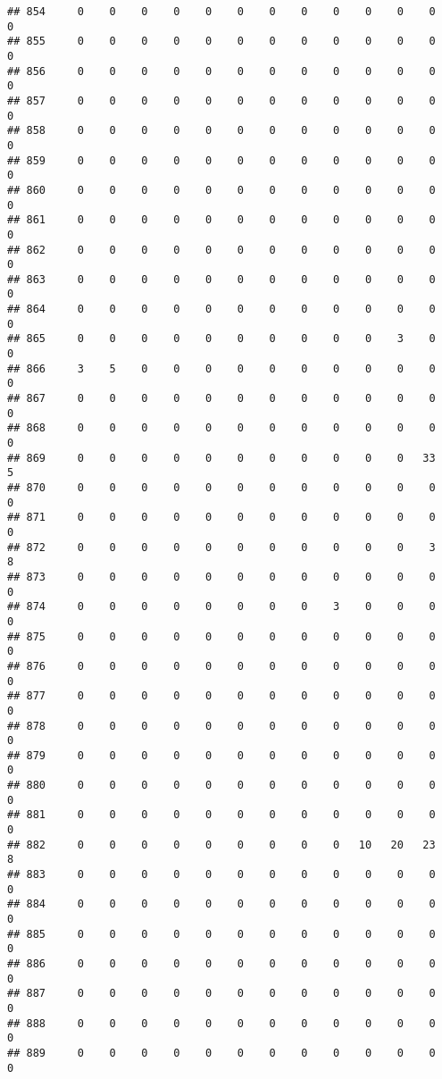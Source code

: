 \documentclass[]{article}
\begin{document}
\begin{verbatim}
## 854     0    0    0    0    0    0    0    0    0    0    0    0    0
## 855     0    0    0    0    0    0    0    0    0    0    0    0    0
## 856     0    0    0    0    0    0    0    0    0    0    0    0    0
## 857     0    0    0    0    0    0    0    0    0    0    0    0    0
## 858     0    0    0    0    0    0    0    0    0    0    0    0    0
## 859     0    0    0    0    0    0    0    0    0    0    0    0    0
## 860     0    0    0    0    0    0    0    0    0    0    0    0    0
## 861     0    0    0    0    0    0    0    0    0    0    0    0    0
## 862     0    0    0    0    0    0    0    0    0    0    0    0    0
## 863     0    0    0    0    0    0    0    0    0    0    0    0    0
## 864     0    0    0    0    0    0    0    0    0    0    0    0    0
## 865     0    0    0    0    0    0    0    0    0    0    3    0    0
## 866     3    5    0    0    0    0    0    0    0    0    0    0    0
## 867     0    0    0    0    0    0    0    0    0    0    0    0    0
## 868     0    0    0    0    0    0    0    0    0    0    0    0    0
## 869     0    0    0    0    0    0    0    0    0    0    0   33    5
## 870     0    0    0    0    0    0    0    0    0    0    0    0    0
## 871     0    0    0    0    0    0    0    0    0    0    0    0    0
## 872     0    0    0    0    0    0    0    0    0    0    0    3    8
## 873     0    0    0    0    0    0    0    0    0    0    0    0    0
## 874     0    0    0    0    0    0    0    0    3    0    0    0    0
## 875     0    0    0    0    0    0    0    0    0    0    0    0    0
## 876     0    0    0    0    0    0    0    0    0    0    0    0    0
## 877     0    0    0    0    0    0    0    0    0    0    0    0    0
## 878     0    0    0    0    0    0    0    0    0    0    0    0    0
## 879     0    0    0    0    0    0    0    0    0    0    0    0    0
## 880     0    0    0    0    0    0    0    0    0    0    0    0    0
## 881     0    0    0    0    0    0    0    0    0    0    0    0    0
## 882     0    0    0    0    0    0    0    0    0   10   20   23    8
## 883     0    0    0    0    0    0    0    0    0    0    0    0    0
## 884     0    0    0    0    0    0    0    0    0    0    0    0    0
## 885     0    0    0    0    0    0    0    0    0    0    0    0    0
## 886     0    0    0    0    0    0    0    0    0    0    0    0    0
## 887     0    0    0    0    0    0    0    0    0    0    0    0    0
## 888     0    0    0    0    0    0    0    0    0    0    0    0    0
## 889     0    0    0    0    0    0    0    0    0    0    0    0    0

\end{verbatim}
\end{document}
